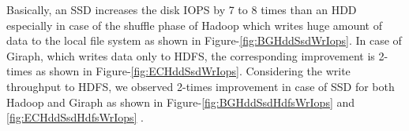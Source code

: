 \documentclass[conference]{IEEEtran}
\begin{document}
Basically, an SSD increases the disk IOPS by 7 to 8 times than an HDD especially in case of the shuffle phase of Hadoop which writes huge amount of data  to  the local file system as shown in Figure-\ref{fig:BGHddSsdWrIops}.
In case of Giraph, which writes data only to HDFS, the corresponding improvement is 2-times as shown in Figure-\ref{fig:ECHddSsdWrIops}.
Considering the write throughput to HDFS, we observed 2-times improvement in case of SSD for both Hadoop and Giraph as shown in Figure-\ref{fig:BGHddSsdHdfsWrIops} and  \ref{fig:ECHddSsdHdfsWrIops} . 


\end{document}
